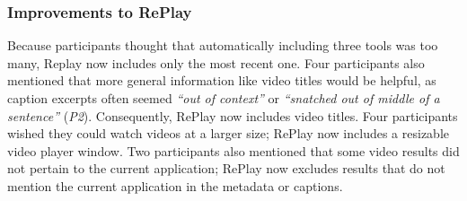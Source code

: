 \subsubsection{Improvements to RePlay}
Because participants thought that automatically including three tools was too many, Replay now includes only the most recent one. Four participants also mentioned that more general information like video titles would be helpful, as caption excerpts often seemed \textit{``out of context''} or \textit{``snatched out of middle of a sentence''} (\textit{P2}). Consequently, RePlay now includes video titles. Four participants wished they could watch videos at a larger size; RePlay now includes a resizable video player window. Two participants also mentioned that some video results did not pertain to the current application; RePlay now excludes results that do not mention the current application in the metadata or captions.
